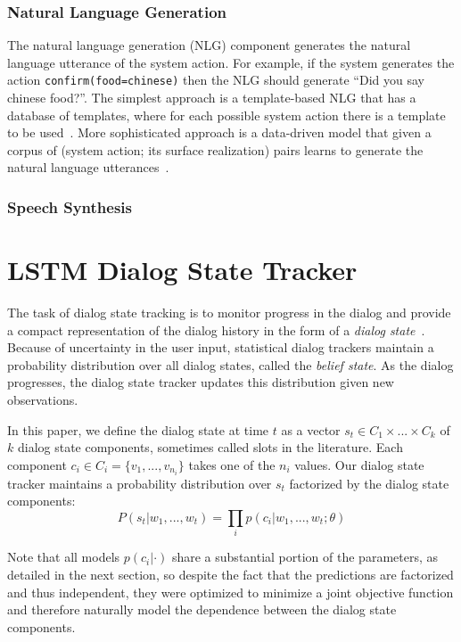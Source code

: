 \documentclass[11pt,twocolumn]{article}
\begin{document}
\subsubsection{Natural Language Generation}
The natural language generation (NLG) component generates the natural language utterance of the system action. For example, if the system generates the action \texttt{confirm(food=chinese)} then the NLG should generate ``Did you say chinese food?''. The simplest approach is a template-based NLG that has a database of templates, where for each possible system action there is a template to be used~\cite{duvsek2014alex}. More sophisticated approach is a data-driven model that given a corpus of (system action; its surface realization) pairs learns to generate the natural language utterances~\cite{mairesse2010phrase}.

\subsubsection{Speech Synthesis}

\section{LSTM Dialog State Tracker}
\label{sec:dialog-state-tracking}
The task of dialog state tracking is to monitor progress in the dialog and provide a compact representation of the dialog history in the form of a \emph{dialog state}~\cite{henderson2014second,zilka2013comparison}. Because of uncertainty in the user input, statistical dialog trackers maintain a probability distribution over all dialog states, called the \emph{belief state}. As the dialog progresses, the dialog state tracker updates this distribution given new observations.

In this paper, we define the dialog state at time $t$ as a vector $s_t \in C_1 \times ... \times C_k$ of $k$ dialog state components, sometimes called slots in the literature. Each component $c_i \in C_i=\{v_1, ..., v_{n_i}\}$ takes one of the $n_i$ values. Our dialog state tracker maintains a probability distribution over $s_t$ factorized by the dialog state components:
$$P(s_t|w_1, ..., w_t)=\prod_i p(c_i|w_1, ..., w_t; \theta)$$

Note that all models $p(c_i|\cdot)$ share a substantial portion of the parameters, as detailed in the next section, so despite the fact that the predictions are factorized and thus independent, they were optimized to minimize a joint objective function and therefore naturally model the dependence between the dialog state components.
\end{document}
